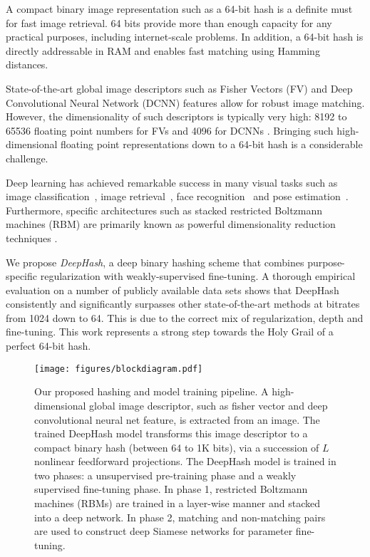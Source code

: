 \documentclass[10pt,twocolumn,letterpaper]{article}
\begin{document}
A compact binary image representation such as a 64-bit hash is a definite must for fast image retrieval.
64 bits provide more than enough capacity for any practical purposes, including internet-scale problems.
In addition, a 64-bit hash is directly addressable in RAM and enables fast matching using Hamming distances.

State-of-the-art global image descriptors such as Fisher Vectors (FV) \cite{Perronnin_CVPR_10} and Deep Convolutional Neural Network (DCNN) features \cite{AlexNet,Yandex} allow for robust image matching.
However, the dimensionality of such descriptors is typically very high: 8192 to 65536 floating point numbers for FVs\cite{Perronnin_CVPR_10} and 4096 for DCNNs \cite{AlexNet}.
Bringing such high-dimensional floating point representations down to a 64-bit hash is a considerable challenge.

Deep learning has achieved remarkable success in many visual tasks such as image classification~\cite{AlexNet,VeryDeepNeuralNets}, image retrieval~\cite{Yandex}, face recognition~\cite{deepface,deepid} and pose estimation~\cite{deeppose}. 
Furthermore, specific architectures such as stacked restricted Boltzmann machines (RBM) are primarily known as powerful dimensionality reduction techniques \cite{HintonRBM}.

We propose {\it DeepHash}, a deep binary hashing scheme that combines purpose-specific regularization with weakly-supervised fine-tuning.
A thorough empirical evaluation on a number of publicly available data sets shows that DeepHash consistently and significantly surpasses other state-of-the-art methods at bitrates from 1024 down to 64.
This is due to the correct mix of regularization, depth and fine-tuning.
This work represents a strong step towards the Holy Grail of a perfect 64-bit hash.


\begin{figure*}[ht] %
  \centering
    \texttt{[image: figures/blockdiagram.pdf]}
  \caption{Our proposed hashing and model training pipeline. A high-dimensional global image descriptor, such as fisher vector and deep convolutional neural net feature, is extracted from an image. The trained DeepHash model transforms this image descriptor to a compact binary hash (between 64 to 1K bits), via a succession of $L$ nonlinear feedforward projections. The DeepHash model is trained in two phases: a unsupervised pre-training phase and a weakly supervised fine-tuning phase. In phase 1, restricted Boltzmann machines (RBMs) are trained in a layer-wise manner and stacked into a deep network. In phase 2, matching and non-matching pairs are used to construct deep Siamese networks for parameter fine-tuning.}
\label{fig:blockdiagram}
\end{figure*}
\end{document}

